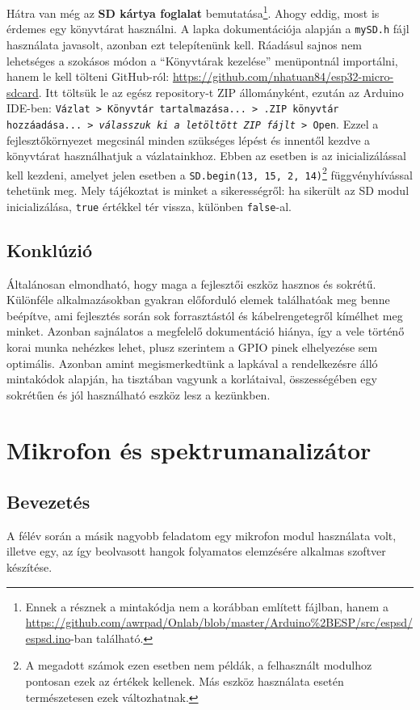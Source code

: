 \documentclass[12pt,a4paper]{article}
\begin{document}
      Hátra van még az \textbf{SD kártya foglalat} bemutatása\footnote{Ennek a résznek a mintakódja nem a korábban említett fájlban, hanem a \url{https://github.com/awrpad/Onlab/blob/master/Arduino\%2BESP/src/espsd/espsd.ino}-ban található.}. Ahogy eddig, most is érdemes egy könyvtárat használni. A lapka dokumentációja alapján a \texttt{mySD.h} fájl használata javasolt, azonban ezt telepítenünk kell. Ráadásul sajnos nem lehetséges a szokásos módon a ``Könyvtárak kezelése'' menüpontnál importálni, hanem le kell tölteni GitHub-ról: \url{https://github.com/nhatuan84/esp32-micro-sdcard}. Itt töltsük le az egész repository-t ZIP állományként, ezután az Arduino IDE-ben: \texttt{Vázlat > Könyvtár tartalmazása... > .ZIP könyvtár hozzáadása... > \textit{{válasszuk ki a letöltött ZIP fájlt}} > Open}. Ezzel a fejlesztőkörnyezet megcsinál minden szükséges lépést és innentől kezdve a könyvtárat használhatjuk a vázlatainkhoz. Ebben az esetben is az inicializálással kell kezdeni, amelyet jelen esetben a \texttt{SD.begin(13, 15, 2, 14)}\footnote{A megadott számok ezen esetben nem példák, a felhasznált modulhoz pontosan ezek az értékek kellenek. Más eszköz használata esetén természetesen ezek változhatnak.} függvényhívással tehetünk meg. Mely tájékoztat is minket a sikerességről: ha sikerült az SD modul inicializálása, \texttt{true} értékkel tér vissza, különben \texttt{false}-al.

    \subsection{Konklúzió}
      Általánosan elmondható, hogy maga a fejlesztői eszköz hasznos és sokrétű. Különféle alkalmazásokban gyakran előforduló elemek találhatóak meg benne beépítve, ami fejlesztés során sok forrasztástól és kábelrengetegről kímélhet meg minket.
      Azonban sajnálatos a megfelelő dokumentáció hiánya, így a vele történő korai munka nehézkes lehet, plusz szerintem a GPIO pinek elhelyezése sem optimális.
      Azonban amint megismerkedtünk a lapkával a rendelkezésre álló mintakódok alapján, ha tisztában vagyunk a korlátaival, összességében egy sokrétűen és jól használható eszköz lesz a kezünkben.

  \section{Mikrofon és spektrumanalizátor}
    \subsection{Bevezetés}
      A félév során a másik nagyobb feladatom egy mikrofon modul használata volt, illetve egy, az így beolvasott hangok folyamatos elemzésére alkalmas szoftver készítése.
\end{document}

